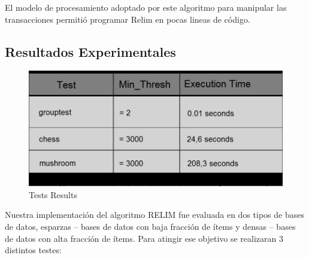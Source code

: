 \documentclass[12pt,spanish]{article}
\begin{document}
El modelo de procesamiento adoptado  por este algoritmo para manipular las transacciones permitió programar Relim en pocas lineas de código.  
\newpage

\subsection{Resultados Experimentales}

\begin{figure}
\centering
\includegraphics[scale=0.6]{testes.png}
\caption{Tests Results}
\end{figure}

Nuestra implementación del algoritmo RELIM fue evaluada en dos tipos de bases de datos, esparzas – bases de datos con baja fracción de ítems y densas – bases de datos con alta fracción de ítems. Para atingir ese objetivo se realizaran 3 distintos testes:
\end{document}
